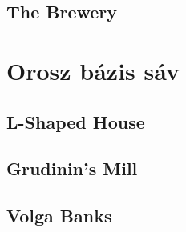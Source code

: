 \subsection{The Brewery}

\section{Orosz bázis sáv}
\subsection{L-Shaped House}

\subsection{Grudinin's Mill}

\subsection{Volga Banks}